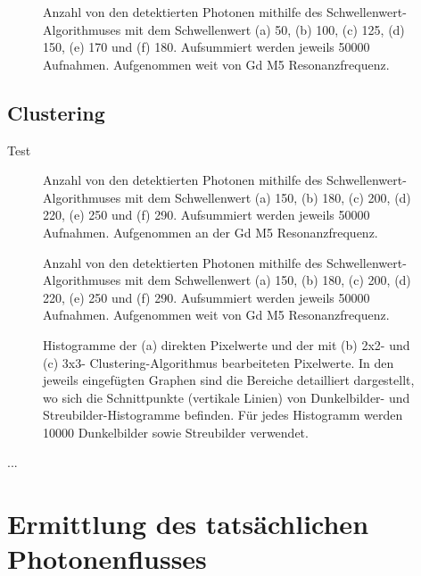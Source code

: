 \begin{figure}[H]
    \centering
    
    \caption{Anzahl von den detektierten Photonen mithilfe des Schwellenwert-Algorithmuses mit dem Schwellenwert (a) \SI{50}{\adu}, (b) \SI{100}{\adu}, (c) \SI{125}{\adu}, (d) \SI{150}{\adu}, (e) \SI{170}{\adu} und (f) \SI{180}{\adu}. Aufsummiert werden jeweils \num{50000} Aufnahmen. Aufgenommen weit von Gd M5 Resonanzfrequenz.}
    \label{fig:th_50_100_125_150_170_180_off_resonance}
\end{figure}
\subsection{Clustering}
\noindent
Test
\begin{figure}[H]
    \centering
    
    \caption{Anzahl von den detektierten Photonen mithilfe des Schwellenwert-Algorithmuses mit dem Schwellenwert (a) \SI{150}{\adu}, (b) \SI{180}{\adu}, (c) \SI{200}{\adu}, (d) \SI{220}{\adu}, (e) \SI{250}{\adu} und (f) \SI{290}{\adu}. Aufsummiert werden jeweils \num{50000} Aufnahmen. Aufgenommen an der Gd M5 Resonanzfrequenz.}
    \label{fig:cl_2_0_100_125_150_170_180_resonance}
\end{figure}

\begin{figure}[H]
    \centering
    
    \caption{Anzahl von den detektierten Photonen mithilfe des Schwellenwert-Algorithmuses mit dem Schwellenwert (a) \SI{150}{\adu}, (b) \SI{180}{\adu}, (c) \SI{200}{\adu}, (d) \SI{220}{\adu}, (e) \SI{250}{\adu} und (f) \SI{290}{\adu}. Aufsummiert werden jeweils \num{50000} Aufnahmen. Aufgenommen weit von Gd M5 Resonanzfrequenz.}
    \label{fig:cl_150_180_200_220_250_290_off_resonance}
\end{figure}
\begin{figure}[H]
    \centering
    
    \caption{Histogramme der (a) direkten Pixelwerte und der mit (b) 2x2- und (c) 3x3- Clustering-Algorithmus bearbeiteten Pixelwerte. In den jeweils eingefügten Graphen sind die Bereiche detailliert dargestellt, wo sich die Schnittpunkte (vertikale Linien) von Dunkelbilder- und Streubilder-Histogramme befinden. Für jedes Histogramm werden \num{10000} Dunkelbilder sowie Streubilder verwendet.}
    \label{fig:no_pr_cl_2_cl_3_histograms}
\end{figure}
...
\section{Ermittlung des tatsächlichen Photonenflusses}
\label{text:butterfly_counting}

